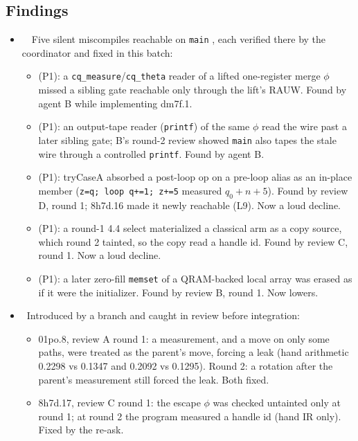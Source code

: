 \subsection*{Findings}
\begin{itemize}
  \item \fconfirmed\ \fpreexisting\ Five silent miscompiles reachable on \texttt{main}
  , each verified there by the coordinator and fixed in this batch:
  \begin{itemize}
    \item {} (P1): a \texttt{cq\_measure}/\texttt{cq\_theta} reader of a lifted
    one-register merge $\phi$ missed a sibling gate reachable only through the lift's
    RAUW. Found by agent B while implementing dm7f.1.
    \item {} (P1): an output-tape reader (\texttt{printf}) of the same $\phi$
    read the wire past a later sibling gate; B's round-2 review showed \texttt{main} also
    tapes the stale wire through a controlled \texttt{printf}. Found by agent B.
    \item {} (P1): tryCaseA absorbed a post-loop op on a pre-loop alias as an
    in-place member (\texttt{z=q; loop q+=1; z+=5} measured $q_0+n+5$). Found by review D,
    round 1; 8h7d.16 made it newly reachable (L9). Now a loud decline.
    \item {} (P1): a round-1 4.4 select materialized a classical arm as a copy
    source, which round 2 tainted, so the copy read a handle id. Found by review C,
    round 1. Now a loud decline.
    \item {} (P1): a later zero-fill \texttt{memset} of a QRAM-backed local
    array was erased as if it were the initializer. Found by review B, round 1. Now lowers.
  \end{itemize}
  \item \fconfirmed\ Introduced by a branch and caught in review before integration:
  \begin{itemize}
    \item 01po.8, review A round 1: a measurement, and a move on only some paths, were
    treated as the parent's move, forcing a leak (hand arithmetic 0.2298 vs 0.1347 and
    0.2092 vs 0.1295). Round 2: a rotation after the parent's measurement still forced
    the leak. Both fixed.
    \item 8h7d.17, review C round 1: the escape $\phi$ was checked untainted only at round
    1; at round 2 the program measured a handle id (hand IR only). Fixed by the re-ask.

\end{itemize}
\end{itemize}
